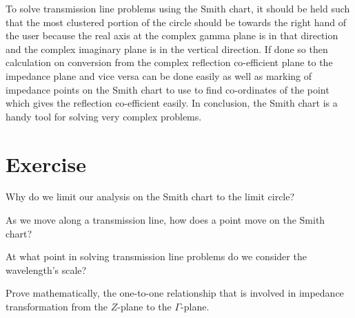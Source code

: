 To solve transmission line problems using the Smith chart, it should be held such that the most clustered portion of the circle should be towards the right hand of the user because the real axis at the complex gamma plane is in that direction and the complex imaginary plane is in the vertical direction. If done so then calculation on conversion from the complex reflection co-efficient plane to the impedance plane and vice versa can be done easily as well as marking of impedance points on the Smith chart to use to find co-ordinates of the point which gives the reflection co-efficient easily. In conclusion, the Smith chart is a handy tool for solving very complex  problems.

\section*{Exercise}
\begin{ExerciseList}
\Exercise[label={ex32}]
Why do we limit our analysis on the Smith chart to the limit circle?

\Exercise[label={ex33}]
As we move along a transmission line, how does a point move on the Smith chart?

\Exercise[label={ex34}]
At what point in solving transmission line problems do we consider the wavelength's scale?

\Exercise[label={ex34}]
Prove mathematically, the one-to-one relationship that is involved in impedance transformation from the ${Z}$-plane to the $\Gamma$-plane.
\end{ExerciseList}